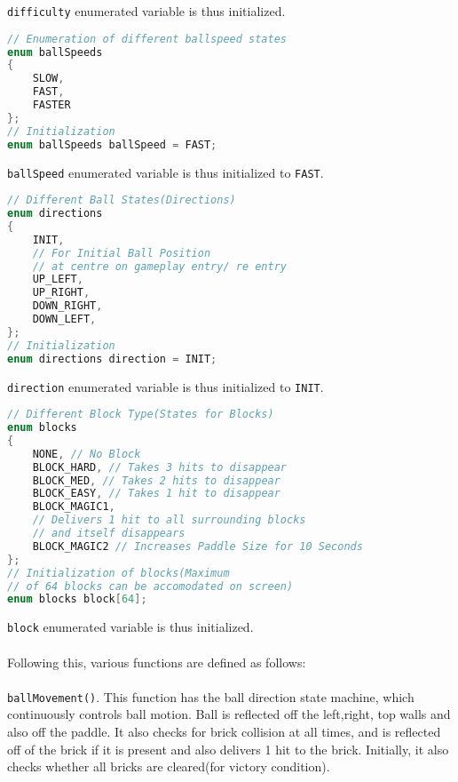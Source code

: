 \documentclass{article}
\begin{document}
    \texttt{difficulty} enumerated variable is thus initialized.
\begin{lstlisting}[basicstyle = \small, language = C]
// Enumeration of different ballspeed states
enum ballSpeeds
{
    SLOW,
    FAST,
    FASTER
};
// Initialization
enum ballSpeeds ballSpeed = FAST;
  \end{lstlisting}
\texttt{ballSpeed} enumerated variable is thus initialized to \texttt{FAST}.
\begin{lstlisting}[basicstyle = \small, language = C]
// Different Ball States(Directions)
enum directions
{
    INIT, 
    // For Initial Ball Position 
    // at centre on gameplay entry/ re entry
    UP_LEFT,
    UP_RIGHT,
    DOWN_RIGHT,
    DOWN_LEFT,
};
// Initialization
enum directions direction = INIT;
  \end{lstlisting}
\texttt{direction} enumerated variable is thus initialized to \texttt{INIT}.
\begin{lstlisting}[basicstyle = \small, language = C]
// Different Block Type(States for Blocks)
enum blocks
{
    NONE, // No Block
    BLOCK_HARD, // Takes 3 hits to disappear
    BLOCK_MED, // Takes 2 hits to disappear
    BLOCK_EASY, // Takes 1 hit to disappear
    BLOCK_MAGIC1, 
    // Delivers 1 hit to all surrounding blocks 
    // and itself disappears
    BLOCK_MAGIC2 // Increases Paddle Size for 10 Seconds
};
// Initialization of blocks(Maximum 
// of 64 blocks can be accomodated on screen)
enum blocks block[64];
  \end{lstlisting}
    \texttt{block} enumerated variable is thus initialized. \\ \\
\qquad Following this, various functions are defined as follows: \\ \\
\texttt{ballMovement()}. This function has the ball direction state machine, which continuously controls ball motion. Ball is reflected off the left,right, top walls and also off the paddle. It also checks for brick collision at all times, and is reflected off of the brick if it is present and also delivers 1 hit to the brick. Initially, it also checks whether all bricks are cleared(for victory condition).
\end{document}
